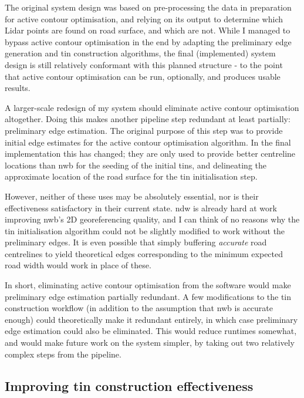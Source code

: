 The original system design was based on pre-processing the data in preparation for active contour optimisation, and relying on its output to determine which Lidar points are found on road surface, and which are not. While I managed to bypass active contour optimisation in the end by adapting the preliminary edge generation and \ac{tin} construction algorithms, the final (implemented) system design is still relatively conformant with this planned structure - to the point that active contour optimisation can be run, optionally, and produces usable results.

A larger-scale redesign of my system should eliminate active contour optimisation altogether. Doing this makes another pipeline step redundant at least partially: preliminary edge estimation. The original purpose of this step was to provide initial edge estimates for the active contour optimisation algorithm. In the final implementation this has changed; they are only used to provide better centreline locations than \ac{nwb} for the seeding of the initial \ac{tin}s, and delineating the approximate location of the road surface for the \ac{tin} initialisation step.

However, neither of these uses may be absolutely essential, nor is their effectiveness satisfactory in their current state. \ac{ndw} is already hard at work improving \ac{nwb}'s 2D georeferencing quality, and I can think of no reasons why the \ac{tin} initialisation algorithm could not be slightly modified to work without the preliminary edges. It is even possible that simply buffering \textit{accurate} road centrelines to yield theoretical edges corresponding to the minimum expected road width would work in place of these.

In short, eliminating active contour optimisation from the software would make preliminary edge estimation partially redundant. A few modifications to the \ac{tin} construction workflow (in addition to the assumption that \ac{nwb} is accurate enough) could theoretically make it redundant entirely, in which case preliminary edge estimation could also be eliminated. This would reduce runtimes somewhat, and would make future work on the system simpler, by taking out two relatively complex steps from the pipeline.

\subsection{Improving \ac{tin} construction effectiveness}
\label{sub:improvementstinconstruction}

